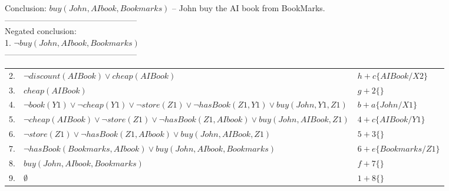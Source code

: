 \documentclass{article}%
\begin{document}
\begin{enumerate}
Conclusion: $ buy(John, AI book, Bookmarks) $ -- John buy the AI book from BookMarks. \\
------------------------------------------------\\
Negated conclusion:  \\
1. $ \neg buy(John, AI book,Bookmarks) $ \\
------------------------------------------------\\
\begin{tabular}{c|p{8cm}|l}
2. & $ \neg discount(AI Book) \vee cheap(AI Book) $ & $h + c \lbrace AI Book/X2 \rbrace $\\ 
3. & $ cheap(AI Book) $ &  $g + 2 \lbrace  \rbrace$ \\
4. & $ \neg book(Y1) \vee \neg cheap(Y1)  \vee \neg store(Z1) \vee \neg hasBook(Z1,Y1) \vee buy(John,Y1,Z1)$& $b + a \lbrace John / X1 \rbrace$\\
5. & $ \neg cheap(AI Book) \vee \neg store(Z1) \vee \neg hasBook(Z1,AI book) \vee buy(John,AI Book, Z1) $ &$ 4 + c \lbrace AI Book / Y1 \rbrace$\\
6. & $ \neg store(Z1) \vee \neg hasBook(Z1,AI book) \vee buy(John,AI Book,Z1) $ &$ 5 + 3 \lbrace \rbrace$\\
7. & $ \neg hasBook(Bookmarks,AI book)  \vee buy(John, AI book,Bookmarks) $ &$ 6 + e \lbrace Bookmarks / Z1 \rbrace$\\ 
8. & $ buy(John, AI book, Bookmarks) $ &$ f + 7 \lbrace \rbrace$\\
9. & $ \emptyset $ &$ 1 + 8 \lbrace \rbrace$\\
\end{tabular} 

\end{enumerate}
\end{document}
